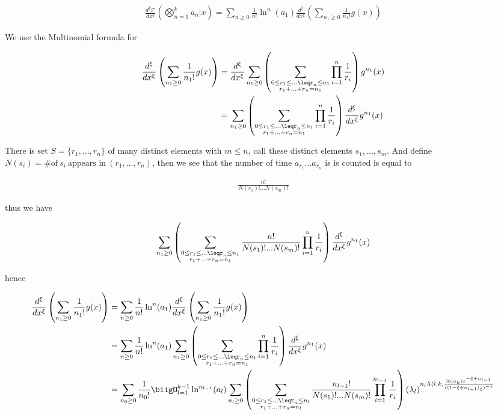 \begin{align}
        \frac{d^\xi\mathcal{T}}{dx^\xi}\left(\bigotimes_{n=1}^ka_n | x\right) 
        = \sum_{n\geq0}\frac{1}{n!}\ln^n(a_1) \frac{d^\xi}{dx^\xi}\left(\sum_{n_1\geq0}
        \frac{1}{n_1!}g(x)\right)
\end{align}

We use the Multinomial formula for

\begin{align}
    \frac{d^\xi}{dx^\xi}\left(\sum_{n_1\geq0}\frac{1}{n_1!}g(x)\right)
    &=  \frac{d^\xi}{dx^\xi} \sum_{n_1\geq0} \left(\sum_{\substack{0\leq
    r_1 \leq...\leqr_n\leq n_1 \\ r_1 +...+r_n = n_1}}\prod_{i=1}^n 
    \frac{1}{r_i}\right)g^{n_1}(x) \\
    &=\sum_{n_1\geq0} \left(\sum_{\substack{0\leq r_1 \leq...\leqr_n\leq
    n_1 \\ r_1 +...+r_n = n_1}}\prod_{i=1}^n \frac{1}{r_i}\right)
    \frac{d^\xi}{dx^\xi}g^{n_1}(x)
\end{align}

There is set \(S=\{r_1, ..., r_n\}\) of many distinct elements with 
\(m \leq n\), call these distinct elements \(s_1, ..., s_m\). And define
\(N(s_i) = \# \mbox{of} \ s_i \ \mbox{appears in} \ (r_1, ..., r_n) \), 
then we see that the number of time \(a_{r_1}...a_{r_n}\) is is counted is equal to 

\begin{align}
    \frac{n!}{N(s_1)!...N(s_m)!}
\end{align}

thus we have

\begin{align}
    \sum_{n_1\geq0} \left(\sum_{\substack{0\leq r_1 \leq...\leqr_n\leq
    n_1 \\ r_1 +...+r_n = n_1}}\frac{n!}{N(s_1)!...N(s_m)!}\prod_{i=1}^n 
    \frac{1}{r_i}\right)\frac{d^\xi}{dx^\xi}g^{n_1}(x)
\end{align}

hence

\begin{align}
      \frac{d^\xi}{dx^\xi}\left(\sum_{n_1\geq0}\frac{1}{n_1!}g(x)\right)
      &=\sum_{n\geq0}\frac{1}{n!}\ln^n(a_1) \frac{d^\xi}{dx^\xi}\left(
      \sum_{n_1\geq0}\frac{1}{n_1!}g(x)\right) \\
      &=\sum_{n\geq 0}\frac{1}{n!}\ln^n(a_1)\sum_{n_1\geq0} 
      \left(\sum_{\substack{0\leq r_1 \leq...\leqr_n\leq n_1 
      \\ r_1 +...+r_n = n_1}}\prod_{i=1}^n \frac{1}{r_i}\right)
      \frac{d^\xi}{dx^\xi}g^{n_1}(x) \\
      & =\sum_{n_0\geq 0}\frac{1}{n_0!}\biigO_{l=1}^{k-1}
      \ln^{n_{l-1}}(a_l)
      \sum_{n_l\geq0} \left(\sum_{\substack{0\leq r_1 \leq...\leqr_n\leq
      n_l \\ r_1 +...+r_n = n_l}}\frac{n_{l-1}!}{N(s_1)!...N(s_m)!}
      \prod_{i=1}^{n_{l-1}} \frac{1}{r_i}\right)(\lambda_l)^{n_l 
      \Lambda(l, k,\frac{\ln(a_k)x^{-\xi+n_{l-1}}}{((1-\xi + n_{l-1})_\xi)^{-1}}}
\end{align}


